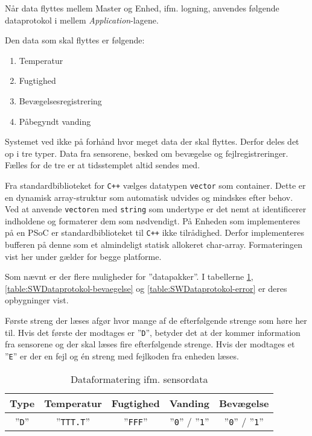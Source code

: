 
Når data flyttes mellem Master og Enhed, ifm. logning, anvendes følgende dataprotokol i mellem \textit{Application}-lagene.

Den data som skal flyttes er følgende:

\begin{enumerate}
	\item Temperatur
	\item Fugtighed
	\item Bevægelsesregistrering
	\item Påbegyndt vanding
\end{enumerate}

Systemet ved ikke på forhånd hvor meget data der skal flyttes. Derfor deles det op i tre typer. Data fra sensorene, besked om bevægelse og fejlregistreringer.
Fælles for de tre er at tidsstemplet altid sendes med.

Fra standardbiblioteket for \verb'C++' vælges datatypen \verb+vector+ som container. Dette er en dynamisk array-struktur som automatisk udvides og mindskes efter behov.
Ved at anvende \verb+vector+en med \verb+string+ som undertype er det nemt at identificerer indholdene og formaterer dem som nødvendigt. På Enheden som implementeres på en PSoC er standardbiblioteket til \verb-C++- ikke tilrådighed. Derfor implementeres bufferen på denne som et almindeligt statisk allokeret char-array. Formateringen vist her under gælder for begge platforme.

Som nævnt er der flere muligheder for ''datapakker''. I tabellerne \ref{table:SWDataprotokol-sensor}, \ref{table:SWDataprotokol-bevaegelse} og \ref{table:SWDataprotokol-error} er deres opbygninger vist.

Første streng der læses afgør hvor mange af de efterfølgende strenge som høre her til. Hvis det første der modtages er ''\verb+D+'', betyder det at der kommer information fra sensorene og der skal læses fire efterfølgende strenge.
Hvis der modtages et ''\verb+E+'' er der en fejl og én streng med fejlkoden fra enheden læses.

\begin{table}[h]
	\caption{Dataformatering ifm. sensordata}
	\centering
	\begin{tabular}{|c|c|c|c|c|}
		\hline 
		\textbf{Type} & \textbf{Temperatur} & \textbf{Fugtighed} & \textbf{Vanding} & \textbf{Bevægelse}\\ 
		\hline 
		''\verb+D+'' & ''\verb+TTT.T+'' & ''\verb+FFF+'' & ''\verb+0+'' / ''\verb+1+'' & ''\verb+0+'' / ''\verb+1+'' \\ 
		\hline 
	\end{tabular} 
	\label{table:SWDataprotokol-sensor}
\end{table}

